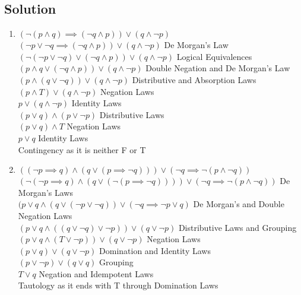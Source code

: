 \documentclass[11pt]{article}
\begin{document}
    \subsection*{Solution}
    \begin{enumerate}[label=(\alph*)]
        \item \((\neg(p\land q) \implies (\neg q \land p)) \lor (q \land \neg p)\) \\
        \((\neg p \lor \neg q \implies (\neg q \land p)) \lor (q \land \neg p)\) De Morgan's Law \\
        \((\neg (\neg p \lor \neg q) \lor (\neg q \land p)) \lor (q \land \neg p)\) Logical Equivalences \\
        \((p \land q \lor (\neg q \land p))  \lor (q \land \neg p)\) Double Negation and De Morgan's Law \\
        \((p \land (q \lor \neg q)) \lor (q \land \neg p)\) Distributive  and Absorption Laws \\
        \((p \land T) \lor (q \land \neg p)\) Negation Laws \\
        \(p \lor (q \land \neg p)\) Identity Laws \\
        \((p\lor q) \land (p \lor \neg p)\) Distributive Laws \\
        \((p \lor q) \land T\) Negation Laws \\
        \(p \lor q\) Identity Laws \\
        Contingency as it is neither F or T
        
        \item \(((\neg p \implies q) \land (q \lor (p \implies \neg q))) \lor (\neg q \implies \neg (p \land \neg q))\) \\
        \((\neg(\neg p \implies q) \land (q \lor (\neg(p \implies \neg q)))) \lor (\neg q \implies \neg (p \land \neg q))\) De Morgan's Laws \\
        \(( p \lor q \land (q \lor (\neg p \lor \neg q)) \lor (\neg q \implies \neg p \lor  q)\) De Morgan's and Double Negation Laws \\
        \((p \lor q \land ((q \lor \neg q) \lor \neg p)) \lor (q \lor \neg p)\) Distributive Laws and Grouping \\
        \((p \lor q \land (T \lor \neg p)) \lor (q \lor \neg p)\) Negation Laws \\
        \((p \lor q) \lor (q \lor \neg p)\) Domination and Identity Laws \\
        \((p \lor \neg p) \lor (q \lor q)\) Grouping \\
        \(T \lor q\) Negation and Idempotent Laws \\
        Tautology as it ends with T through Domination Laws
                
        
    \end{enumerate}
    
\end{document}
